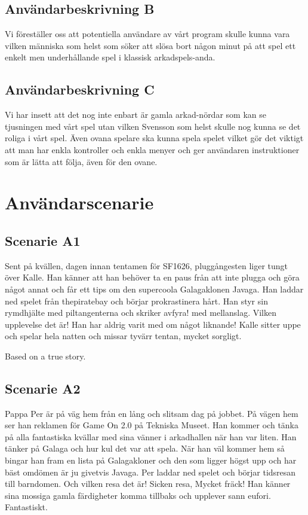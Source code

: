 \documentclass[a4paper,11pt]{article}
\begin{document}
\subsection{Användarbeskrivning B}
Vi föreställer oss att potentiella användare av vårt program skulle kunna vara vilken människa som helst som söker att slösa bort någon minut på att spel ett enkelt men underhållande spel i klassisk arkadspels-anda.

\subsection{Användarbeskrivning C}
Vi har insett att det nog inte enbart är gamla arkad-nördar som kan se tjusningen med vårt spel utan vilken Svensson som helst skulle nog kunna se det roliga i vårt spel. Även ovana spelare ska kunna spela spelet vilket gör det viktigt att man har enkla kontroller och enkla menyer och ger användaren instruktioner som är lätta att följa, även för den ovane.


\section{Användarscenarie}
\subsection{Scenarie A1}
Sent på kvällen, dagen innan tentamen för SF1626, pluggångesten liger tungt över Kalle. Han känner att han behöver ta en paus från att inte plugga och göra något annat och får ett tips om den supercoola Galagaklonen Javaga. Han laddar ned spelet från thepiratebay och börjar prokrastinera hårt. Han styr sin rymdhjälte med piltangenterna och skriker avfyra! med mellanslag. Vilken upplevelse det är! Han har aldrig varit med om något liknande! Kalle sitter uppe och spelar hela natten och missar tyvärr tentan, mycket sorgligt. 

\noindent
Based on a true story.

\subsection{Scenarie A2}
Pappa Per är på väg hem från en lång och slitsam dag på jobbet. På vägen hem ser han reklamen för Game On 2.0 på Tekniska Museet. Han kommer och tänka på alla fantastiska kvällar med sina vänner i arkadhallen när han var liten. Han tänker på Galaga och hur kul det var att spela. När han väl kommer hem så bingar han fram en lista på Galagakloner och den som ligger högst upp och har bäst omdömen är ju givetvis Javaga. Per laddar ned spelet och börjar tidsresan till barndomen. Och vilken resa det är! Sicken resa, Mycket fräck! Han känner sina mossiga gamla färdigheter komma tillbaks och upplever sann eufori. Fantastiskt.
\end{document}
